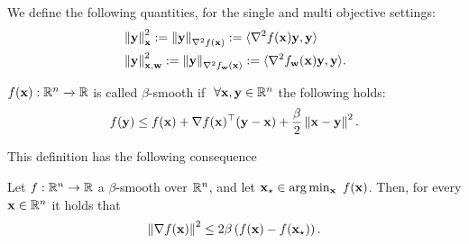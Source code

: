 We define the following quantities, for the single and multi objective settings:
\begin{align*}
    &\left\Vert{\mathbf{y}}\right\Vert^2_{{\mathbf{x}}} :=\left\Vert{\mathbf{y}}\right\Vert_{\nabla^2 f({\mathbf{x}})} := \langle \nabla^2 f({\mathbf{x}}) {\mathbf{y}}, {\mathbf{y}} \rangle \\
    &\left\Vert{\mathbf{y}}\right\Vert^2_{{\mathbf{x}},{\mathbf{w}}} :=\left\Vert{\mathbf{y}}\right\Vert_{\nabla^2 f_{\mathbf{w}}({\mathbf{x}})} := \langle \nabla^2 f_{\mathbf{w}}({\mathbf{x}}) {\mathbf{y}}, {\mathbf{y}} \rangle.
\end{align*}
\begin{definition}[Smoothness] \label{ass:smooth}
    $f({\mathbf{x}}) : \mathbb{R}^n \xrightarrow{} \mathbb{R}$ is called $\beta$-smooth if $~\forall {\mathbf{x}}, {\mathbf{y}} \in \mathbb{R}^n$ the following holds:
    \begin{align}
        f({\mathbf{y}}) \leq  f({\mathbf{x}}) + \nabla f({\mathbf{x}})^{\top} ({\mathbf{y}} - {\mathbf{x}}) + \frac{\beta}{2}  \left\Vert {\mathbf{x}} - {\mathbf{y}} \right\Vert ^2. \nonumber
    \end{align}
\end{definition}

This definition has the following consequence
\begin{lemma} \label{lemma:smooth-gradient-norm}
    Let $f : \mathbb{R}^n \to \mathbb{R}$ a $\beta$-smooth over $\mathbb{R}^n$, and let ${\mathbf{x}}_\star \in \arg\min_{{\mathbf{x}}} ~ f({\mathbf{x}})$.  Then, for every ${\mathbf{x}} \in \mathbb{R}^n$ it holds that
    \begin{align*}
        \left\Vert\nabla f ({\mathbf{x}})\right\Vert^2 \leq 2\beta \left(f({\mathbf{x}}) - f({\mathbf{x}}_\star)\right).
    \end{align*}
\end{lemma}





